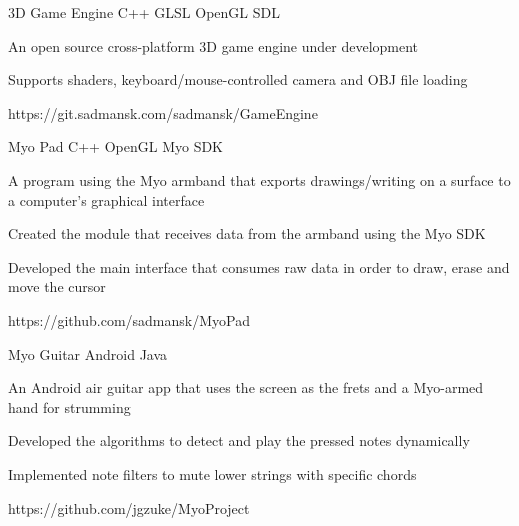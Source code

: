 



\begin{cvprojects}

\cvproject
{3D Game Engine}
{C++ \textbullet{} GLSL \textbullet{} OpenGL \textbullet{} SDL}
{
An open source cross-platform 3D game engine under development
\begin{cvitems}
\item[]
\item {Supports shaders, keyboard/mouse-controlled camera and OBJ file loading}
\end{cvitems}
}
{https://git.sadmansk.com/sadmansk/GameEngine}


\cvproject
{Myo Pad}
{C++ \textbullet{} OpenGL \textbullet{} Myo SDK}
{
A program using the Myo armband that exports drawings/writing on a surface to a computer's graphical interface 
\begin{cvitems}
\item[]
\item {Created the module that receives data from the armband using the Myo SDK}
\item {Developed the main interface that consumes raw data in order to draw, erase and move the cursor}
\end{cvitems}
}
{https://github.com/sadmansk/MyoPad}


\cvproject
{Myo Guitar}
{Android \textbullet{} Java}
{
An Android air guitar app that uses the screen as the frets and a Myo-armed hand for strumming
\begin{cvitems}
\item[]
\item {Developed the algorithms to detect and play the pressed notes dynamically}
\item {Implemented note filters to mute lower strings with specific chords}
\end{cvitems}
}
{https://github.com/jgzuke/MyoProject}


\end{cvprojects}
